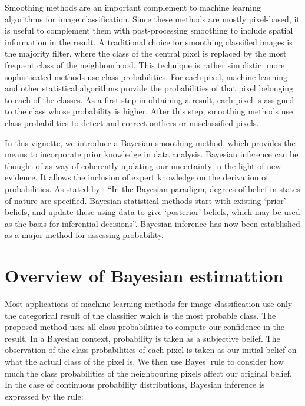 \documentclass[a4paper,]{tufte-book}
\begin{document}
Smoothing methods are an important complement to machine learning algorithms for image classification. Since these methods are mostly pixel-based, it is useful to complement them with post-processing smoothing to include spatial information in the result. A traditional choice for smoothing classified images is the majority filter, where the class of the central pixel is replaced by the most frequent class of the neighbourhood. This technique is rather simplistic; more sophisticated methods use class probabilities. For each pixel, machine learning and other statistical algorithms provide the probabilities of that pixel belonging to each of the classes. As a first step in obtaining a result, each pixel is assigned to the class whose probability is higher. After this step, smoothing methods use class probabilities to detect and correct outliers or misclassified pixels.

In this vignette, we introduce a Bayesian smoothing method, which provides the means to incorporate prior knowledge in data analysis. Bayesian inference can be thought of as way of coherently updating our uncertainty in the light of new evidence. It allows the inclusion of expert knowledge on the derivation of probabilities. As stated by \cite{Spiegelhalter2009}: ``In the Bayesian paradigm, degrees of belief in states of nature are specified. Bayesian statistical methods start with existing `prior' beliefs, and update these using data to give `posterior' beliefs, which may be used as the basis for inferential decisions''. Bayesian inference has now been established as a major method for assessing probability.

\hypertarget{overview-of-bayesian-estimattion}{%
\section{Overview of Bayesian estimattion}\label{overview-of-bayesian-estimattion}}

Most applications of machine learning methods for image classification use only the categorical result of the classifier which is the most probable class. The proposed method uses all class probabilities to compute our confidence in the result. In a Bayesian context, probability is taken as a subjective belief. The observation of the class probabilities of each pixel is taken as our initial belief on what the actual class of the pixel is. We then use Bayes' rule to consider how much the class probabilities of the neighbouring pixels affect our original belief. In the case of continuous probability distributions, Bayesian inference is expressed by the rule:
\end{document}
